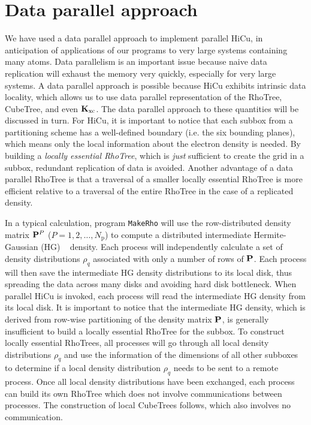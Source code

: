 \documentclass[preprint]{revtex4}
\newcommand{\Kxc}{{\bf K}_{\mathrm{xc}}}
\newcommand{\Np}{N_{\mathrm{p}}} \newcommand{\Nbox}{N_{\mathrm{b}}}
\begin{document}
\section{Data parallel approach}
\label{sec:data-locality}
We have used a data parallel approach to implement parallel HiCu, in
anticipation of applications of our programs to very large systems
containing many atoms.  Data parallelism is an important issue because
naive data replication will exhaust the memory very quickly,
especially for very large systems. A data parallel approach is
possible because HiCu exhibits intrinsic data locality, which allows
us to use data parallel representation of the RhoTree, CubeTree, and
even $\Kxc$. The data parallel approach to these quantities will be
discussed in turn.  For HiCu, it is important to notice that each
subbox from a partitioning scheme has a well-defined boundary
(i.e. the six bounding planes), which means only the local information
about the electron density is needed.  By building a {\it locally
essential RhoTree}, which is {\it just}
sufficient to create the grid in a subbox, redundant replication of
data is avoided. Another advantage of a data parallel RhoTree is that
a traversal of a smaller locally essential RhoTree is more
efficient relative to a traversal of the entire RhoTree in the case of a
replicated density.

In a typical calculation, program {\tt MakeRho} will use the
row-distributed density matrix ${\bf P}^{P}$ ($P = 1, 2, \ldots, \Np$) 
to compute a distributed
intermediate Hermite-Gaussian (HG) ~\cite{Ahmadi95,Challacombe_00v113}
density.  Each process will independently calculate a set of density
distributions $\rho_q$ associated with only a number of rows
of ${\bf P}$. Each process will then save the
intermediate HG density distributions to its local disk, thus
spreading the data across many disks and avoiding hard disk
bottleneck. When parallel HiCu is invoked, each process will read the
intermediate HG density from its local disk.  It is important to
notice that the intermediate HG density, which is derived from
row-wise partitioning of the density matrix ${\bf P}$, is generally insufficient
to build a locally essential RhoTree for the subbox.  To
construct locally essential RhoTrees, all processes will go through
all local density distributions $\rho_q$ and use the information of
the dimensions of all other subboxes to determine if a local density
distribution $\rho_q$ needs to be sent to a remote process.
Once all local density distributions have been exchanged, each process
can build its own RhoTree which does not involve communications
between processes.  The construction of local CubeTrees follows,
which also involves no communication.
\end{document}
